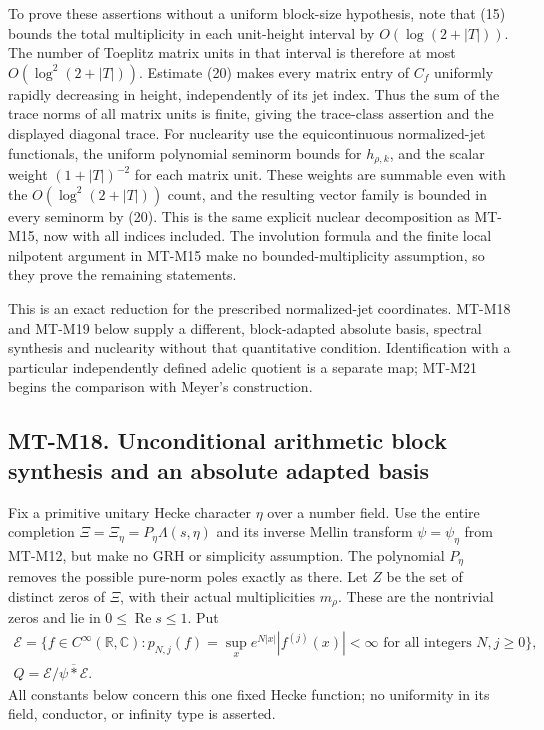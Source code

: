 \documentclass[11pt,a4paper]{article}
\begin{document}
To prove these assertions without a uniform block-size
hypothesis, note that (15) bounds the total multiplicity
in each unit-height interval by $O(\log(2+|T|))$.
The number of Toeplitz matrix units in that interval is
therefore at most $O(\log^2(2+|T|))$.
Estimate (20) makes every matrix entry of $C_f$ uniformly
rapidly decreasing in height, independently of its jet
index. Thus the sum of the trace norms of all matrix
units is finite, giving the trace-class assertion and
the displayed diagonal trace. For nuclearity use the
equicontinuous normalized-jet functionals, the uniform
polynomial seminorm bounds for $h_{\rho,k}$, and the
scalar weight $(1+|T|)^{-2}$ for each matrix unit.
These weights are summable even with the
$O(\log^2(2+|T|))$ count, and the resulting vector
family is bounded in every seminorm by (20).
This is the same explicit nuclear decomposition as
MT-M15, now with all indices included.
The involution formula and the finite local nilpotent
argument in MT-M15 make no bounded-multiplicity
assumption, so they prove the remaining statements.

This is an exact reduction for the prescribed normalized-jet
coordinates. MT-M18 and MT-M19 below supply a different,
block-adapted absolute basis, spectral synthesis and nuclearity
without that quantitative condition. Identification with a
particular independently defined adelic quotient is a separate
map; MT-M21 begins the comparison with Meyer's construction.

\subsection*{MT-M18. Unconditional arithmetic block synthesis and an absolute adapted basis}

Fix a primitive unitary Hecke character \(\eta\) over a number field.
Use the entire completion \(\Xi=\Xi_\eta=P_\eta\Lambda(s,\eta)\)
and its inverse Mellin transform \(\psi=\psi_\eta\) from MT-M12,
but make no GRH or simplicity assumption.  The polynomial \(P_\eta\)
removes the possible pure-norm poles exactly as there.  Let \(Z\)
be the set of distinct zeros of \(\Xi\), with their actual
multiplicities \(m_\rho\).  These are the nontrivial zeros and
lie in \(0\le\operatorname{Re}s\le1\).
Put
\[
 \begin{gathered}
 \mathcal E=\{f\in C^\infty(\mathbb R,\mathbb C):
   p_{N,j}(f)=\sup_x e^{N|x|}|f^{(j)}(x)|<\infty
                    \text{ for all integers }N,j\ge0\},\\
 Q=\mathcal E/\overline{\psi*\mathcal E}.
 \end{gathered}
\]
All constants below concern this one fixed Hecke function; no
uniformity in its field, conductor, or infinity type is asserted.
\end{document}
